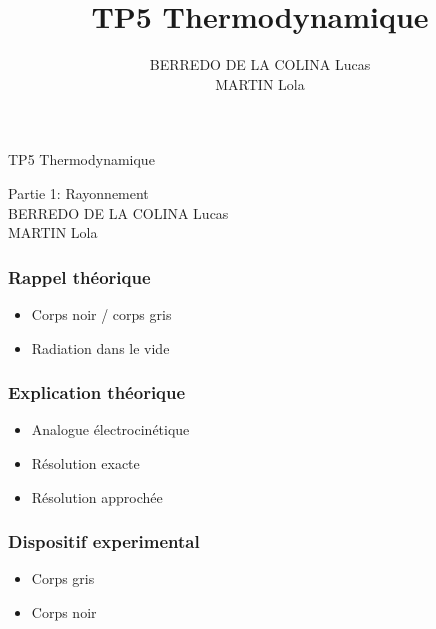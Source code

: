\documentclass{beamer}
\title{TP5 Thermodynamique}
\author{BERREDO DE LA COLINA Lucas\\ MARTIN Lola}
\date{}
\begin{document}
\begin{frame}

\Huge{TP5 Thermodynamique}

\Large{Partie 1: Rayonnement}
\\[2em]
\large{BERREDO DE LA COLINA Lucas\\ MARTIN Lola}

\end{frame}





\begin{frame}
\frametitle{Rappel théorique}

\begin{itemize}
	\item{Corps noir / corps gris}
	\item{Radiation dans le vide}

\end{itemize}

\end{frame}





\begin{frame}
\frametitle{Explication théorique}

\begin{itemize}
	\item{Analogue électrocinétique}
	\item{Résolution exacte}
	\item{Résolution approchée}
	
\end{itemize}

\end{frame}





\begin{frame}
\frametitle{Dispositif experimental}

\begin{itemize}
	\item{Corps gris}
	\item{Corps noir}

\end{itemize}
\end{frame}
\end{document}
